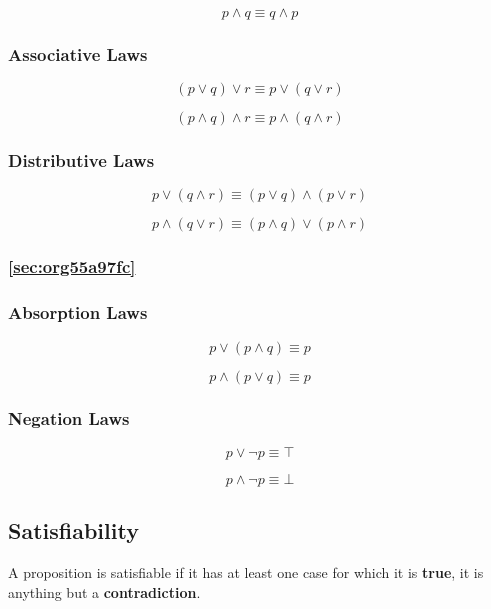 \documentclass[11pt]{article}
\begin{document}
\[
p \land q \equiv q \land p
\]
\subsubsection{Associative Laws}
\label{sec:org1514741}
\[
(p \lor q) \lor r \equiv p \lor (q \lor r)
\]

\[
(p \land q) \land r \equiv p \land (q \land r)
\]
\subsubsection{Distributive Laws}
\label{sec:org29c8fe4}
\[
p \lor (q \land r) \equiv (p \lor q) \land (p \lor r)
\]

\[
p \land (q \lor r) \equiv (p \land q) \lor (p \land r)
\]
\subsubsection{\ref{sec:org55a97fc}}
\label{sec:org4cadf10}
\subsubsection{Absorption Laws}
\label{sec:orgaf8e2c4}
\[
p \lor (p \land q) \equiv p
\]

\[
p \land (p \lor q) \equiv p
\]
\subsubsection{Negation Laws}
\label{sec:org54b5b71}
\[
p \lor \neg p \equiv \top
\]

\[
p \land \neg p \equiv \bot
\]
\subsection{Satisfiability}
\label{sec:org1973582}
A proposition is satisfiable if it has at least one case for which it is \textbf{true}, it is anything but a \textbf{contradiction}.
\end{document}
